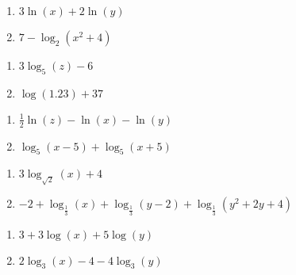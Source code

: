 \begin{multicols}{2}
\begin{enumerate}

\item $3\ln(x) + 2\ln(y)$
\item $7 - \log_{2}(x^{2} + 4)$

\setcounter{HW}{\value{enumi}}
\end{enumerate}
\end{multicols}

\begin{multicols}{2}
\begin{enumerate}
\setcounter{enumi}{\value{HW}}


\item $3\log_{5}(z) - 6$
\item $\log(1.23) + 37$

\setcounter{HW}{\value{enumi}}
\end{enumerate}
\end{multicols}

\begin{multicols}{2}
\begin{enumerate}
\setcounter{enumi}{\value{HW}}

\item $\frac{1}{2}\ln(z) - \ln(x) - \ln(y)$
\item  $\log_{5}(x-5) + \log_{5}(x+5)$

\setcounter{HW}{\value{enumi}}
\end{enumerate}
\end{multicols}

\begin{multicols}{2}
\begin{enumerate}
\setcounter{enumi}{\value{HW}}

\item  $3\log_{\sqrt{2}}(x) + 4$
\item \small$-2 + \log_{\frac{1}{3}}(x) + \log_{\frac{1}{3}}(y - 2) + \log_{\frac{1}{3}}(y^{2} + 2y + 4)$\normalsize

\setcounter{HW}{\value{enumi}}
\end{enumerate}
\end{multicols}

\begin{multicols}{2}
\begin{enumerate}
\setcounter{enumi}{\value{HW}}

\item $3 + 3\log(x) + 5 \log(y)$
\item $2\log_{3}(x) - 4 - 4\log_{3}(y)$

\setcounter{HW}{\value{enumi}}
\end{enumerate}
\end{multicols}

